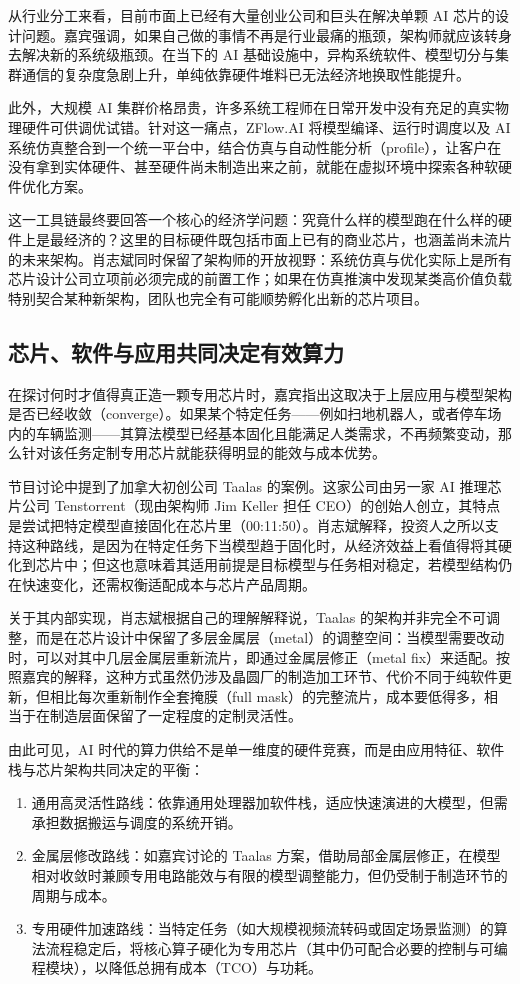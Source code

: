 \documentclass[UTF8,a4paper,11pt,fontset=fandol]{ctexart}
\begin{document}
从行业分工来看，目前市面上已经有大量创业公司和巨头在解决单颗 AI 芯片的设计问题。嘉宾强调，如果自己做的事情不再是行业最痛的瓶颈，架构师就应该转身去解决新的系统级瓶颈。在当下的 AI 基础设施中，异构系统软件、模型切分与集群通信的复杂度急剧上升，单纯依靠硬件堆料已无法经济地换取性能提升。

此外，大规模 AI 集群价格昂贵，许多系统工程师在日常开发中没有充足的真实物理硬件可供调优试错。针对这一痛点，ZFlow.AI 将模型编译、运行时调度以及 AI 系统仿真整合到一个统一平台中，结合仿真与自动性能分析（profile），让客户在没有拿到实体硬件、甚至硬件尚未制造出来之前，就能在虚拟环境中探索各种软硬件优化方案。

这一工具链最终要回答一个核心的经济学问题：究竟什么样的模型跑在什么样的硬件上是最经济的？这里的目标硬件既包括市面上已有的商业芯片，也涵盖尚未流片的未来架构。肖志斌同时保留了架构师的开放视野：系统仿真与优化实际上是所有芯片设计公司立项前必须完成的前置工作；如果在仿真推演中发现某类高价值负载特别契合某种新架构，团队也完全有可能顺势孵化出新的芯片项目。

\subsection{芯片、软件与应用共同决定有效算力}
在探讨何时才值得真正造一颗专用芯片时，嘉宾指出这取决于上层应用与模型架构是否已经收敛（converge）。如果某个特定任务——例如扫地机器人，或者停车场内的车辆监测——其算法模型已经基本固化且能满足人类需求，不再频繁变动，那么针对该任务定制专用芯片就能获得明显的能效与成本优势。

节目讨论中提到了加拿大初创公司 Taalas 的案例。这家公司由另一家 AI 推理芯片公司 Tenstorrent（现由架构师 Jim Keller 担任 CEO）的创始人创立，其特点是尝试把特定模型直接固化在芯片里（00:11:50）。肖志斌解释，投资人之所以支持这种路线，是因为在特定任务下当模型趋于固化时，从经济效益上看值得将其硬化到芯片中；但这也意味着其适用前提是目标模型与任务相对稳定，若模型结构仍在快速变化，还需权衡适配成本与芯片产品周期。

关于其内部实现，肖志斌根据自己的理解解释说，Taalas 的架构并非完全不可调整，而是在芯片设计中保留了多层金属层（metal）的调整空间：当模型需要改动时，可以对其中几层金属层重新流片，即通过金属层修正（metal fix）来适配。按照嘉宾的解释，这种方式虽然仍涉及晶圆厂的制造加工环节、代价不同于纯软件更新，但相比每次重新制作全套掩膜（full mask）的完整流片，成本要低得多，相当于在制造层面保留了一定程度的定制灵活性。

由此可见，AI 时代的算力供给不是单一维度的硬件竞赛，而是由应用特征、软件栈与芯片架构共同决定的平衡：
\begin{enumerate}
\item 通用高灵活性路线：依靠通用处理器加软件栈，适应快速演进的大模型，但需承担数据搬运与调度的系统开销。
\item 金属层修改路线：如嘉宾讨论的 Taalas 方案，借助局部金属层修正，在模型相对收敛时兼顾专用电路能效与有限的模型调整能力，但仍受制于制造环节的周期与成本。
\item 专用硬件加速路线：当特定任务（如大规模视频流转码或固定场景监测）的算法流程稳定后，将核心算子硬化为专用芯片（其中仍可配合必要的控制与可编程模块），以降低总拥有成本（TCO）与功耗。
\end{enumerate}
\end{document}

